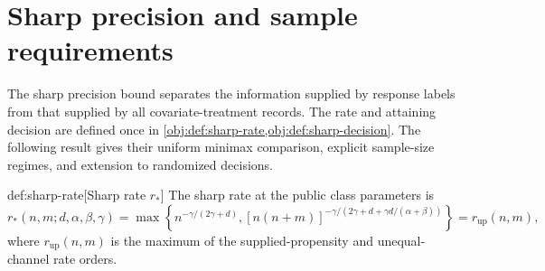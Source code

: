\section{Sharp precision and sample requirements}\label{sec:sharp-precision}

The sharp precision bound separates the information supplied by response labels from that supplied by all covariate-treatment records. The rate and attaining decision are defined once in \cref{obj:def:sharp-rate,obj:def:sharp-decision}. The following result gives their uniform minimax comparison, explicit sample-size regimes, and extension to randomized decisions.

\begin{definitionv}{def:sharp-rate}[Sharp rate \(r_*\)]
The sharp rate at the public class parameters is
\[
r_*(n,m;d,\alpha,\beta,\gamma)
=
\max\left\{
n^{-\gamma/(2\gamma+d)},
[n(n+m)]^{-\gamma/(2\gamma+d+\gamma d/(\alpha+\beta))}
\right\}
=
r_{\mathrm{up}}(n,m),
\]
where \(r_{\mathrm{up}}(n,m)\) is the maximum of the supplied-propensity and unequal-channel rate orders.
\end{definitionv}

